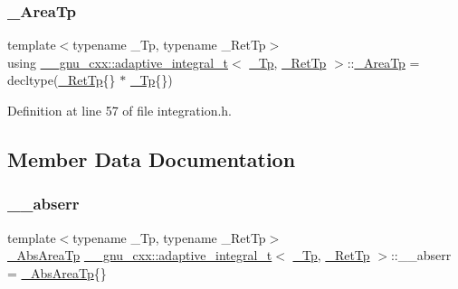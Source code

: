 \mbox{\label{struct____gnu__cxx_1_1adaptive__integral__t_a9371ae517b6bff468e44130718d90f8b}} 
\subsubsection{\texorpdfstring{\+\_\+\+Area\+Tp}{\_AreaTp}}
{\footnotesize\ttfamily template$<$typename \+\_\+\+Tp, typename \+\_\+\+Ret\+Tp$>$ \\
using \hyperlink{struct____gnu__cxx_1_1adaptive__integral__t}{\+\_\+\+\_\+gnu\+\_\+cxx\+::adaptive\+\_\+integral\+\_\+t}$<$ \hyperlink{namespace____gnu__cxx_a3b19a9c800ca194374ef9172290f7d79}{\+\_\+\+Tp}, \hyperlink{namespace____gnu__cxx_a886e03ece3d53ff7fa6c098a40f93fa5}{\+\_\+\+Ret\+Tp} $>$\+::\hyperlink{struct____gnu__cxx_1_1adaptive__integral__t_a9371ae517b6bff468e44130718d90f8b}{\+\_\+\+Area\+Tp} =  decltype(\hyperlink{namespace____gnu__cxx_a886e03ece3d53ff7fa6c098a40f93fa5}{\+\_\+\+Ret\+Tp}\{\} $\ast$ \hyperlink{namespace____gnu__cxx_a3b19a9c800ca194374ef9172290f7d79}{\+\_\+\+Tp}\{\})}



Definition at line 57 of file integration.\+h.



\subsection{Member Data Documentation}
\mbox{\label{struct____gnu__cxx_1_1adaptive__integral__t_aa0edf7f036470e8eaaaa1d5e5126d8b3}} 
\subsubsection{\texorpdfstring{\+\_\+\+\_\+abserr}{\_\_abserr}}
{\footnotesize\ttfamily template$<$typename \+\_\+\+Tp, typename \+\_\+\+Ret\+Tp$>$ \\
\hyperlink{struct____gnu__cxx_1_1adaptive__integral__t_a2da7a99af03e272efd03b876a6b28308}{\+\_\+\+Abs\+Area\+Tp} \hyperlink{struct____gnu__cxx_1_1adaptive__integral__t}{\+\_\+\+\_\+gnu\+\_\+cxx\+::adaptive\+\_\+integral\+\_\+t}$<$ \hyperlink{namespace____gnu__cxx_a3b19a9c800ca194374ef9172290f7d79}{\+\_\+\+Tp}, \hyperlink{namespace____gnu__cxx_a886e03ece3d53ff7fa6c098a40f93fa5}{\+\_\+\+Ret\+Tp} $>$\+::\+\_\+\+\_\+abserr = \hyperlink{struct____gnu__cxx_1_1adaptive__integral__t_a2da7a99af03e272efd03b876a6b28308}{\+\_\+\+Abs\+Area\+Tp}\{\}}



